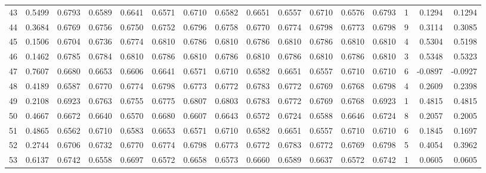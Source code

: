 \begin{tabular}{lrrrrrrrrrrrrrrr}
43  &      0.5499 &  0.6793 &  0.6589 &  0.6641 &  0.6571 &  0.6710 &  0.6582 &  0.6651 &  0.6557 &  0.6710 &   0.6576 &     0.6793 &      1 &                    0.1294 &                     0.1294 \\
44  &      0.3684 &  0.6769 &  0.6756 &  0.6750 &  0.6752 &  0.6796 &  0.6758 &  0.6770 &  0.6774 &  0.6798 &   0.6773 &     0.6798 &      9 &                    0.3114 &                     0.3085 \\
45  &      0.1506 &  0.6704 &  0.6736 &  0.6774 &  0.6810 &  0.6786 &  0.6810 &  0.6786 &  0.6810 &  0.6786 &   0.6810 &     0.6810 &      4 &                    0.5304 &                     0.5198 \\
46  &      0.1462 &  0.6785 &  0.6784 &  0.6810 &  0.6786 &  0.6810 &  0.6786 &  0.6810 &  0.6786 &  0.6810 &   0.6786 &     0.6810 &      3 &                    0.5348 &                     0.5323 \\
47  &      0.7607 &  0.6680 &  0.6653 &  0.6606 &  0.6641 &  0.6571 &  0.6710 &  0.6582 &  0.6651 &  0.6557 &   0.6710 &     0.6710 &      6 &                   -0.0897 &                    -0.0927 \\
48  &      0.4189 &  0.6587 &  0.6770 &  0.6774 &  0.6798 &  0.6773 &  0.6772 &  0.6783 &  0.6772 &  0.6769 &   0.6768 &     0.6798 &      4 &                    0.2609 &                     0.2398 \\
49  &      0.2108 &  0.6923 &  0.6763 &  0.6755 &  0.6775 &  0.6807 &  0.6803 &  0.6783 &  0.6772 &  0.6769 &   0.6768 &     0.6923 &      1 &                    0.4815 &                     0.4815 \\
50  &      0.4667 &  0.6672 &  0.6640 &  0.6570 &  0.6680 &  0.6607 &  0.6643 &  0.6572 &  0.6724 &  0.6588 &   0.6646 &     0.6724 &      8 &                    0.2057 &                     0.2005 \\
51  &      0.4865 &  0.6562 &  0.6710 &  0.6583 &  0.6653 &  0.6571 &  0.6710 &  0.6582 &  0.6651 &  0.6557 &   0.6710 &     0.6710 &      6 &                    0.1845 &                     0.1697 \\
52  &      0.2744 &  0.6706 &  0.6732 &  0.6770 &  0.6774 &  0.6798 &  0.6773 &  0.6772 &  0.6783 &  0.6772 &   0.6769 &     0.6798 &      5 &                    0.4054 &                     0.3962 \\
53  &      0.6137 &  0.6742 &  0.6558 &  0.6697 &  0.6572 &  0.6658 &  0.6573 &  0.6660 &  0.6589 &  0.6637 &   0.6572 &     0.6742 &      1 &                    0.0605 &                     0.0605 \\

\end{tabular}
